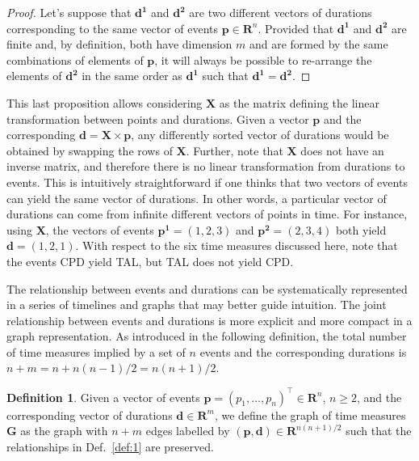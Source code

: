 \documentclass[12pt,oneside,a4paper,doublespacing]{article} %
\theoremstyle{definition}
\newtheorem{definition}{Definition}[section]
\begin{document}
\begin{proof}
 Let's suppose that $\boldsymbol{d^1}$ and $\boldsymbol{d^2}$ are two different
 vectors of durations corresponding to the same vector of events
 $\boldsymbol{p}\in\mathbf{R}^n$. Provided that $\boldsymbol{d^1}$ and
 $\boldsymbol{d^2}$ are finite and, by definition, both have dimension $m$ and are formed by the same combinations of elements of $\boldsymbol{p}$, it will always be possible to re-arrange the elements of $\boldsymbol{d^2}$ in the same order as $\boldsymbol{d^1}$ such that $\boldsymbol{d^1}=\boldsymbol{d^2}$.
\end{proof}

This last proposition allows considering $\boldsymbol{X}$ as the matrix defining
the linear transformation between points and durations. Given a vector
$\boldsymbol{p}$ and the corresponding
$\boldsymbol{d}=\boldsymbol{X}\times\boldsymbol{p}$, any differently sorted
vector of durations would be obtained by swapping the rows of $\boldsymbol{X}$.
Further, note that $\boldsymbol{X}$ does not have an inverse matrix, and
therefore there is no linear transformation from durations to events. This is
intuitively straightforward if one thinks that two vectors of events can yield
the same vector of durations. In other words, a particular vector of durations
can come from infinite different vectors of points in time. For instance, using
$\boldsymbol{X}$, the vectors of events $\boldsymbol{p^1}=(1,2,3)$ and
$\boldsymbol{p^2}=(2,3,4)$ both yield $\boldsymbol{d}=(1,2,1)$. With respect to
the six time measures discussed here, note that the events CPD yield TAL, but TAL does not yield CPD.

The relationship between events and durations can be
systematically represented in a series of timelines and graphs that may better
guide intuition.
The joint relationship between events and durations is more explicit and more
compact in a graph representation. As introduced in the following definition, the total number of time measures implied by a set of $n$ events and the corresponding durations is 
$n+m=n+n(n-1)/2=n(n+1)/2$. 

\begin{definition}
 Given a vector of events $\boldsymbol{p}=(p_1,\ldots,p_n)^\top\in\mathbf{R}^n$,
 $n\geq2$, and the corresponding vector of durations
 $\boldsymbol{d}\in\mathbf{R}^m$, we define the graph of time measures
 $\boldsymbol{G}$ as the graph with $n+m$ edges
 labelled by $(\boldsymbol{p},\boldsymbol{d})\in\mathbf{R}^{n(n+1)/2}$ such that
 the relationships in Def.~\ref{def:1} are preserved.
 \label{def:2}
\end{definition}
\end{document}

